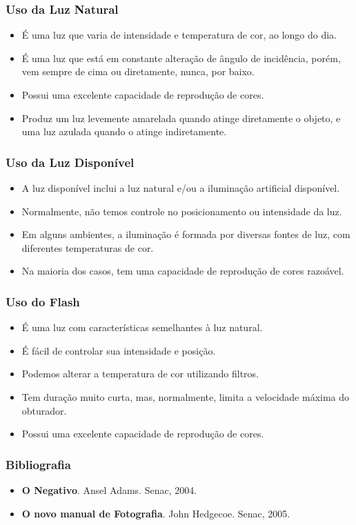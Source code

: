 
\begin{frame}
    \frametitle{Uso da Luz Natural}
    \begin{itemize}
      \item É uma luz que varia de intensidade e temperatura de cor, ao longo do dia.
      \item É uma luz que está em constante alteração de ângulo de incidência, porém,
      vem sempre de cima ou diretamente, nunca, por baixo.
      \item Possui uma excelente capacidade de reprodução de cores.
      \item Produz um luz levemente amarelada quando atinge diretamente o objeto,
      e uma luz azulada quando o atinge indiretamente.
    \end{itemize}
\end{frame}

\begin{frame}
    \frametitle{Uso da Luz Disponível}
    \begin{itemize}
      \item A luz disponível inclui a luz natural e/ou a iluminação artificial disponível.
      \item Normalmente, não temos controle no posicionamento ou intensidade da luz.
      \item Em alguns ambientes, a iluminação é formada por diversas fontes de luz, com
      diferentes temperaturas de cor.
      \item Na maioria dos casos, tem uma capacidade de reprodução de cores razoável.
    \end{itemize}
\end{frame}

\begin{frame}
    \frametitle{Uso do Flash}
    \begin{itemize}
      \item É uma luz com características semelhantes à luz natural.
      \item É fácil de controlar sua intensidade e posição.
      \item Podemos alterar a temperatura de cor utilizando filtros.
      \item Tem duração muito curta, mas, normalmente, limita a velocidade máxima do obturador.
      \item Possui uma excelente capacidade de reprodução de cores.
    \end{itemize}
\end{frame}


\begin{frame}
    \frametitle{Bibliografia}
    \begin{itemize}
      \item \textbf{O Negativo}. Ansel Adams. Senac, 2004.
      \item \textbf{O novo manual de Fotografia}. John Hedgecoe. Senac, 2005.
    \end{itemize}
\end{frame}


